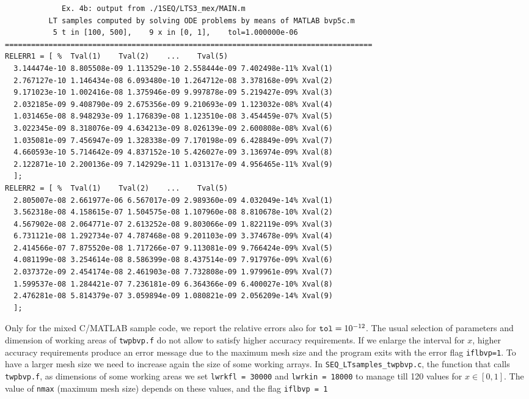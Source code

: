 \documentclass[a4paper,10pt]{report}%
\begin{document}
\begin{lstlisting}
             Ex. 4b: output from ./1SEQ/LTS3_mex/MAIN.m
          LT samples computed by solving ODE problems by means of MATLAB bvp5c.m
           5 t in [100, 500],    9 x in [0, 1],    tol=1.000000e-06
====================================================================================
RELERR1 = [ %  Tval(1)    Tval(2)    ...    Tval(5)
  3.144474e-10 8.805508e-09 1.113529e-10 2.558444e-09 7.402498e-11% Xval(1)
  2.767127e-10 1.146434e-08 6.093480e-10 1.264712e-08 3.378168e-09% Xval(2)
  9.171023e-10 1.002416e-08 1.375946e-09 9.997878e-09 5.219427e-09% Xval(3)
  2.032185e-09 9.408790e-09 2.675356e-09 9.210693e-09 1.123032e-08% Xval(4)
  1.031465e-08 8.948293e-09 1.176839e-08 1.123510e-08 3.454459e-07% Xval(5)
  3.022345e-09 8.318076e-09 4.634213e-09 8.026139e-09 2.600808e-08% Xval(6)
  1.035081e-09 7.456947e-09 1.328338e-09 7.170198e-09 6.428849e-09% Xval(7)
  4.660593e-10 5.714642e-09 4.837152e-10 5.426027e-09 3.136974e-09% Xval(8)
  2.122871e-10 2.200136e-09 7.142929e-11 1.031317e-09 4.956465e-11% Xval(9)
  ];
RELERR2 = [ %  Tval(1)    Tval(2)    ...    Tval(5)
  2.805007e-08 2.661977e-06 6.567017e-09 2.989360e-09 4.032049e-14% Xval(1)
  3.562318e-08 4.158615e-07 1.504575e-08 1.107960e-08 8.810678e-10% Xval(2)
  4.567902e-08 2.064771e-07 2.613252e-08 9.803066e-09 1.822119e-09% Xval(3)
  6.731121e-08 1.292734e-07 4.787468e-08 9.201103e-09 3.374678e-09% Xval(4)
  2.414566e-07 7.875520e-08 1.717266e-07 9.113081e-09 9.766424e-09% Xval(5)
  4.081199e-08 3.254614e-08 8.586399e-08 8.437514e-09 7.917976e-09% Xval(6)
  2.037372e-09 2.454174e-08 2.461903e-08 7.732808e-09 1.979961e-09% Xval(7)
  1.599537e-08 1.284421e-07 7.236181e-09 6.364366e-09 6.400027e-10% Xval(8)
  2.476281e-08 5.814379e-07 3.059894e-09 1.080821e-09 2.056209e-14% Xval(9)
  ];
\end{lstlisting}
Only for the mixed C/MATLAB sample code, we report the relative errors also for ${\tt tol}=10^{-12}$.
The usual selection of parameters and dimension of working areas of {\tt twpbvp.f} do not allow to satisfy
higher accuracy requirements. If we enlarge the interval for $x$, higher accuracy requirements produce
an error message due to the maximum mesh size and the program exits with the error flag {\tt iflbvp=1}.
To have a larger mesh size we need to increase again the size of some working arrays.
In {\tt SEQ\_LTsamples\_twpbvp.c}, the function that calls {\tt twpbvp.f}, as dimensions of some working areas
we set {\tt lwrkfl = 30000} and {\tt lwrkin = 18000} to manage till 120 values for $x\in[0,1]$.
The value of {\tt nmax} (maximum mesh size) depends on these values, and the flag {\tt iflbvp = 1}
\end{document}
